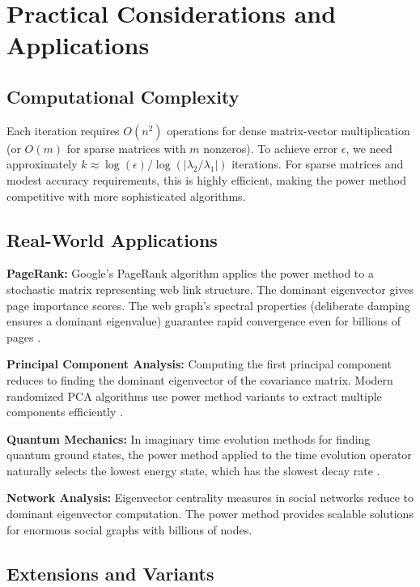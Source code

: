 \documentclass[11pt,a4paper]{article}
\begin{document}
\section{Practical Considerations and Applications}

\subsection{Computational Complexity}
Each iteration requires $O(n^2)$ operations for dense matrix-vector multiplication (or $O(m)$ for sparse matrices with $m$ nonzeros). To achieve error $\epsilon$, we need approximately $k \approx \log(\epsilon)/\log(|\lambda_2/\lambda_1|)$ iterations. For sparse matrices and modest accuracy requirements, this is highly efficient, making the power method competitive with more sophisticated algorithms.

\subsection{Real-World Applications}

\textbf{PageRank:} Google's PageRank algorithm applies the power method to a stochastic matrix representing web link structure. The dominant eigenvector gives page importance scores. The web graph's spectral properties (deliberate damping ensures a dominant eigenvalue) guarantee rapid convergence even for billions of pages \cite{pagerank}.

\textbf{Principal Component Analysis:} Computing the first principal component reduces to finding the dominant eigenvector of the covariance matrix. Modern randomized PCA algorithms use power method variants to extract multiple components efficiently \cite{halko2011}.

\textbf{Quantum Mechanics:} In imaginary time evolution methods for finding quantum ground states, the power method applied to the time evolution operator naturally selects the lowest energy state, which has the slowest decay rate \cite{quantum}.

\textbf{Network Analysis:} Eigenvector centrality measures in social networks reduce to dominant eigenvector computation. The power method provides scalable solutions for enormous social graphs with billions of nodes.

\subsection{Extensions and Variants}
\end{document}

